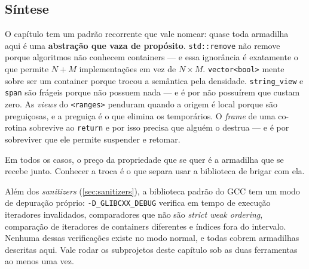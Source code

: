 \subsection{Síntese}

O capítulo tem um padrão recorrente que vale nomear: quase toda armadilha aqui
é uma \textbf{abstração que vaza de propósito}. \texttt{std::remove} não remove
porque algoritmos não conhecem containers --- e essa ignorância é exatamente o
que permite $N + M$ implementações em vez de $N \times M$.
\texttt{vector<bool>} mente sobre ser um container porque trocou a semântica
pela densidade. \texttt{string\_view} e \texttt{span} são frágeis porque não
possuem nada --- e é por não possuírem que custam zero. As \emph{views} do
\texttt{<ranges>} penduram quando a origem é local porque são preguiçosas, e a
preguiça é o que elimina os temporários. O \emph{frame} de uma co-rotina
sobrevive ao \texttt{return} e por isso precisa que alguém o destrua --- e é
por sobreviver que ele permite suspender e retomar.

Em todos os casos, o preço da propriedade que se quer é a armadilha que se
recebe junto. Conhecer a troca é o que separa usar a biblioteca de brigar com
ela.

\begin{regra}
Além dos \emph{sanitizers} (\cref{sec:sanitizers}), a biblioteca padrão do GCC
tem um modo de depuração próprio: \texttt{-D\_GLIBCXX\_DEBUG} verifica em tempo
de execução iteradores invalidados, comparadores que não são \emph{strict weak
ordering}, comparação de iteradores de containers diferentes e índices fora do
intervalo. Nenhuma dessas verificações existe no modo normal, e todas cobrem
armadilhas descritas aqui. Vale rodar os subprojetos deste capítulo sob as duas
ferramentas ao menos uma vez.
\end{regra}
